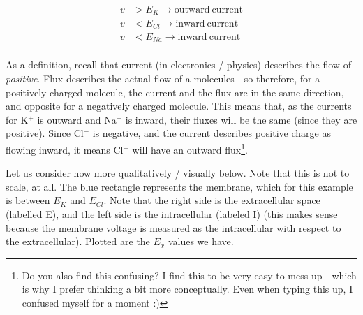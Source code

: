 \begin{equation} \label{court1}
\begin{split}
v &> E_K \longrightarrow \mathrm{outward\:current}\\
v &< E_{Cl} \longrightarrow \mathrm{inward\:current}\\
v &< E_{Na} \longrightarrow \mathrm{inward\:current}\\
\end{split}
\end{equation}

As a definition, recall that current (in electronics / physics) describes the flow of \textit{positive}. Flux describes the actual flow of a molecules---so therefore, for a positively charged molecule, the current and the flux are in the same direction, and opposite for a negatively charged molecule. This means that, as the currents for K$^+$ is outward and Na$^+$ is inward, their fluxes will be the same (since they are positive). Since Cl$^-$ is negative, and the current describes positive charge as flowing inward, it means Cl$^-$ will have an outward flux\footnote{Do you also find this confusing? I find this to be very easy to mess up---which is why I prefer thinking a bit more conceptually. Even when typing this up, I confused myself for a moment :)}.\newline


Let us consider now more qualitatively / visually below. Note that this is not to scale, at all. The blue rectangle represents the membrane, which for this example is between $E_K$ and $E_{Cl}$. Note that the right side is the extracellular space (labelled E), and the left side is the intracellular (labeled I) (this makes sense because the membrane voltage is measured as the intracellular with respect to the extracellular). Plotted are the $E_x$ values we have.

